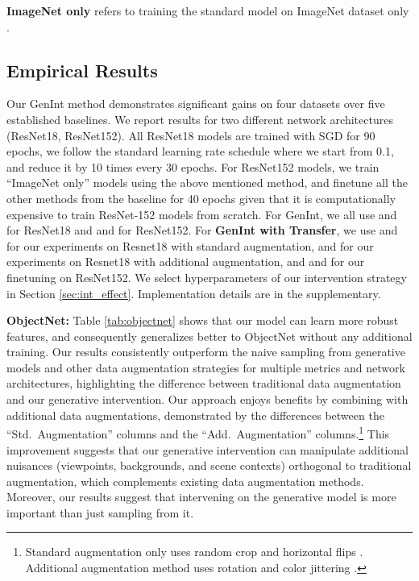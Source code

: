 \documentclass[final]{cvpr}
\begin{document}
\textbf{ImageNet only} refers to training the standard model on ImageNet dataset only \cite{He_2016}.



\subsection{Empirical Results}

 Our GenInt method demonstrates significant gains on four datasets over five established baselines.
 We report results for two different network architectures (ResNet18, ResNet152). All ResNet18 models are trained with SGD for 90 epochs, we follow the standard learning rate schedule where we start from 0.1, and reduce it by 10 times every 30 epochs.
For ResNet152 models, we train ``ImageNet only'' models using the above mentioned method, and finetune all the other methods from the baseline for 40 epochs given that it is computationally expensive to train ResNet-152 models from scratch. 
For GenInt, we all use  and  for ResNet18 and  and  for ResNet152. For \textbf{GenInt with Transfer}, we use  and  for our experiments on Resnet18 with standard augmentation,  and  for our experiments on Resnet18 with additional augmentation, and  and  for our finetuning on ResNet152. We select hyperparameters of our intervention strategy in Section \ref{sec:int_effect}. Implementation details are in the supplementary.



\textbf{ObjectNet:}
Table \ref{tab:objectnet} shows that our model can learn more robust features, and consequently generalizes better to ObjectNet without any additional training. 
Our results consistently outperform the naive sampling from generative models \cite{CAS} and other data augmentation strategies \cite{zhang2017mixup, imagenetbiased, cubuk2018autoaugment} for multiple metrics and network architectures, highlighting the difference between traditional data augmentation and our generative intervention. Our approach enjoys benefits by combining with additional data augmentations, demonstrated by the differences between the ``Std.\ Augmentation'' columns and the ``Add.\ Augmentation'' columns.\footnote{Standard augmentation only uses random crop and horizontal flips \cite{pytorch_imagenet}. Additional augmentation method uses rotation and color jittering \cite{tian2020rethinking}.} This improvement suggests that our generative intervention can manipulate additional nuisances (viewpoints, backgrounds, and scene contexts) orthogonal to traditional augmentation, which complements existing data augmentation methods. Moreover, our results suggest that intervening on the generative model is more important than just sampling from it.
\end{document}
